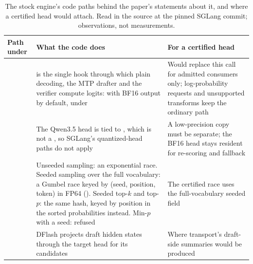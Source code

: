 \begin{table}[htbp]
\tablefont\centering
\caption{The stock engine's code paths behind the paper's statements about it, and where a certified head would attach. Read in the source at the pinned SGLang commit; observations, not measurements.}
\label{tab:integration}
\vskip 0.05in
\begin{tabularx}{\linewidth}{@{}P{4.3cm}YP{5.0cm}@{}}\toprule
Path under  & What the code does & For a certified head\\\midrule
{} &  is the single hook through which plain decoding, the MTP drafter and the verifier compute logits:  with BF16 output by default,  under  & Would replace this call for admitted consumers only; log-probability requests and unsupported transforms keep the ordinary path\\\addlinespace[3pt]
 & The Qwen3.5 head is tied to , which is not a , so SGLang's quantized-head paths do not apply & A low-precision copy must be separate; the BF16 head stays resident for re-scoring and fallback\\\addlinespace[3pt]
 & Unseeded sampling: an exponential race. Seeded sampling over the full vocabulary: a Gumbel race keyed by (seed, position, token) in FP64 (). Seeded top-$k$ and top-$p$: the same hash, keyed by position in the sorted probabilities instead. Min-$p$ with a seed: refused~\cite{sglangsampler} & The certified race uses the full-vocabulary seeded field\\\addlinespace[3pt]
 & DFlash projects draft hidden states through the target head for its candidates & Where transport's draft-side summaries would be produced\\\bottomrule
\end{tabularx}
\end{table}
